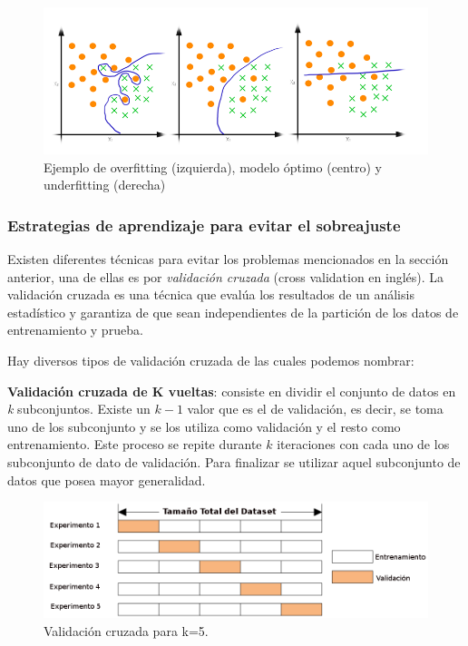 \begin{figure}[h]
 \centering
  \includegraphics[scale=0.4,keepaspectratio=true,clip=true]{imagenes/MarcoTeorico/OverFUnderF.png}
  \caption{Ejemplo de overfitting (izquierda), modelo óptimo (centro) y underfitting (derecha) }%
	\label{Fig: overUnder}
\end{figure}



\subsubsection{Estrategias de aprendizaje para evitar el sobreajuste}

Existen diferentes técnicas para evitar los problemas mencionados en la sección anterior, una de ellas es por  \textit{validación cruzada} (cross validation en inglés). La validación cruzada es una técnica que evalúa los resultados de un análisis estadístico y garantiza de que sean independientes de la partición de los datos de entrenamiento y prueba. 

Hay diversos tipos de validación cruzada de las cuales podemos nombrar:


\par \textbf{Validación cruzada de K vueltas}: consiste en dividir el conjunto de datos en \textit{k} subconjuntos. Existe un $k-1 $ valor que es el de validación, es decir, se toma uno de los subconjunto y se los utiliza como validación y el resto como entrenamiento.  Este proceso se repite durante $k $ iteraciones con cada uno de los subconjunto de dato de validación. Para finalizar se utilizar aquel subconjunto de datos que posea mayor generalidad.
\begin{figure}[H]
 \centering
  \includegraphics[scale=0.4,keepaspectratio=true,clip=true]{imagenes/MarcoTeorico/crossvalidat.png}
  \caption{Validación cruzada para k=5.}%
	\label{Fig: crossvalidation}
\end{figure}

